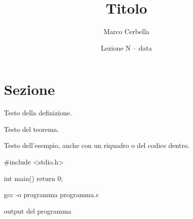 \documentclass[11pt,a4paper]{article}
\title{Titolo}
\author{Marco Cerbella}
\date{Lezione N -- data}
\begin{document}
\maketitle

\section{Sezione}

\begin{definizione}
Testo della definizione.
\end{definizione}

\begin{teorema}
Testo del teorema.
\end{teorema}

\begin{esempio}
Testo dell'esempio, anche con un riquadro o del codice dentro.
\end{esempio}

\begin{codice}
#include <stdio.h>

int main() {
    return 0;
}
\end{codice}

\begin{comando}
gcc -o programma programma.c
\end{comando}

\begin{risultato}
output del programma
\end{risultato}

\begin{center}
\end{center}
\end{document}
